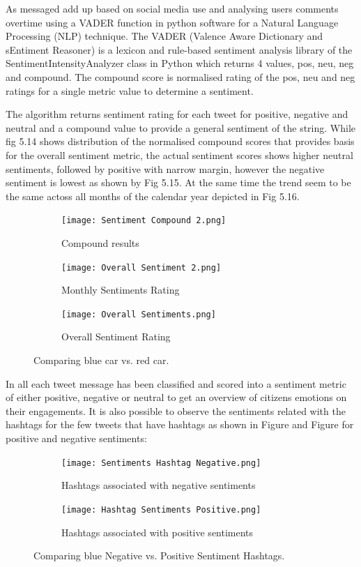 As messaged add up based on social media use and analysing users comments overtime using a VADER function in python software for a Natural Language Processing (NLP) technique.  
The VADER (Valence Aware Dictionary and sEntiment Reasoner) is a lexicon and rule-based sentiment analysis library of the SentimentIntensityAnalyzer class in Python which returns 4 values, pos, neu, neg and compound.  The compound score is normalised rating of the pos, neu and neg ratings for a single metric value to determine a sentiment. 

The algorithm returns sentiment rating for each tweet for positive, negative and neutral and a compound value to provide a general sentiment of the string.  
While fig 5.14 shows distribution of the normalised compound scores that provides basis for the overall sentiment metric, the actual sentiment scores shows higher neutral sentiments, followed by positive with narrow margin, however the negative sentiment is lowest as shown by Fig 5.15.  At the same time the trend seem to be the same actoss all months of the calendar year depicted in Fig 5.16.\\

\begin{figure}
      \centering
	    \begin{subfigure}{0.1\linewidth}
		\texttt{[image: Sentiment Compound 2.png]}
		\caption{Compound results}
		\label{fig:subfig1}
	   \end{subfigure}
	   \begin{subfigure}{0.1\linewidth}
		\texttt{[image: Overall Sentiment 2.png]}
		\caption{Monthly Sentiments Rating}
		\label{fig:subfig2}
	    \end{subfigure}
	   \vfill
	   \begin{subfigure}{0.1\linewidth}
	   \texttt{[image: Overall Sentiments.png]}
	   \caption{Overall Sentiment Rating}
	   \label{fig:subfig3}
	   \end{subfigure}
	 \caption{Comparing blue car vs. red car.}
\end{figure}

In all each tweet message has been classified and scored into a sentiment metric of either positive, negative or neutral to get an overview of citizens emotions on their engagements.  It is also possible to observe the sentiments related with the hashtags for the few tweets that have hashtags as shown in Figure and Figure for positive and negative sentiments:\\

\begin{figure}
      \centering
	    \begin{subfigure}{0.1\linewidth}
		\texttt{[image: Sentiments Hashtag Negative.png]}
		\caption{Hashtags associated with negative sentiments}
		\label{fig:subfig1}
	   \end{subfigure}
	   \begin{subfigure}{0.1\linewidth}
		\texttt{[image: Hashtag Sentiments Positive.png]}
		\caption{Hashtags associated with positive sentiments}
		\label{fig:subfig2}
	    \end{subfigure}
	   \vfill
	 \caption{Comparing blue Negative vs. Positive Sentiment Hashtags.}
\end{figure}

